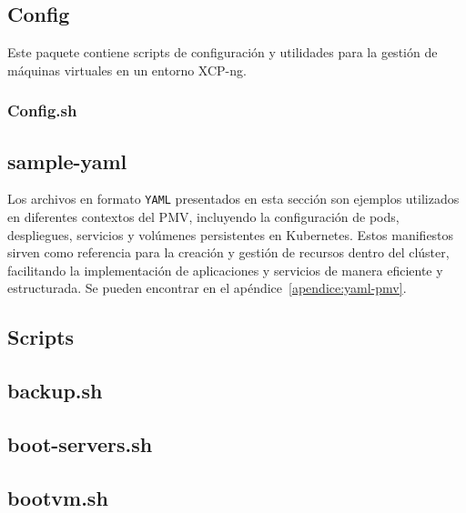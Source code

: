 \subsection{Config}
\noindent
Este paquete contiene scripts de configuración y utilidades para la gestión de máquinas virtuales en un entorno XCP-ng.
\subsubsection{Config.sh}
\noindent



\subsection{sample-yaml}
\noindent
Los archivos en formato \texttt{YAML} presentados en esta sección son ejemplos utilizados en diferentes contextos del PMV, incluyendo la configuración de pods, despliegues, servicios y volúmenes persistentes en Kubernetes. Estos manifiestos sirven como referencia para la creación y gestión de recursos dentro del clúster, facilitando la implementación de aplicaciones y servicios de manera eficiente y estructurada.
Se pueden encontrar en el apéndice~\ref{apendice:yaml-pmv}.


\subsection{Scripts}

\subsection{backup.sh}
\noindent


\subsection{boot-servers.sh}
\noindent


\subsection{bootvm.sh}
\noindent


